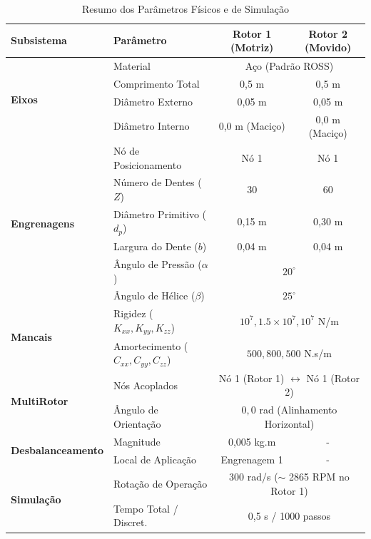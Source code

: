 \documentclass[10pt,fleqn,a4paper,twoside]{article}
\begin{document}
	\begin{table}[H] %
		\centering
		\caption{Resumo dos Parâmetros Físicos e de Simulação}
		\label{tab:parametros_multirotor}
		\renewcommand{\arraystretch}{1.2} 
		\begin{tabular}{@{}llcc@{}}
			\toprule
			\textbf{Subsistema} & \textbf{Parâmetro} & \textbf{Rotor 1 (Motriz)} & \textbf{Rotor 2 (Movido)} \\ \midrule
			
			\multirow{4}{*}{\textbf{Eixos}} 
			& Material & \multicolumn{2}{c}{Aço (Padrão ROSS)} \\
			& Comprimento Total & 0,5 m & 0,5 m \\
			& Diâmetro Externo & 0,05 m & 0,05 m \\
			& Diâmetro Interno & 0,0 m (Maciço) & 0,0 m (Maciço) \\ \midrule
			
			\multirow{6}{*}{\textbf{Engrenagens}} 
			& Nó de Posicionamento & Nó 1 & Nó 1 \\
			& Número de Dentes ($Z$) & 30 & 60 \\
			& Diâmetro Primitivo ($d_p$) & 0,15 m & 0,30 m \\
			& Largura do Dente ($b$) & 0,04 m & 0,04 m \\
			& Ângulo de Pressão ($\alpha$) & \multicolumn{2}{c}{$20^\circ$} \\
			& Ângulo de Hélice ($\beta$) & \multicolumn{2}{c}{$25^\circ$} \\ \midrule
			
			\multirow{2}{*}{\textbf{Mancais}} 
			& Rigidez ($K_{xx}, K_{yy}, K_{zz}$) & \multicolumn{2}{c}{$10^7, 1.5 \times 10^7, 10^7$ N/m} \\
			& Amortecimento ($C_{xx}, C_{yy}, C_{zz}$) & \multicolumn{2}{c}{$500, 800, 500$ N.s/m} \\ \midrule
			
			\multirow{2}{*}{\textbf{MultiRotor}} 
			& Nós Acoplados & \multicolumn{2}{c}{Nó 1 (Rotor 1) $\leftrightarrow$ Nó 1 (Rotor 2)} \\
			& Ângulo de Orientação & \multicolumn{2}{c}{$0,0$ rad (Alinhamento Horizontal)} \\ \midrule
			
			\multirow{2}{*}{\textbf{Desbalanceamento}} 
			& Magnitude & 0,005 kg.m & - \\
			& Local de Aplicação & Engrenagem 1 & - \\ \midrule
			
			\multirow{3}{*}{\textbf{Simulação}} 
			& Rotação de Operação & \multicolumn{2}{c}{300 rad/s ($\sim$ 2865 RPM no Rotor 1)} \\
			& Tempo Total / Discret. & \multicolumn{2}{c}{0,5 s / 1000 passos} \\ 
			\bottomrule
		\end{tabular}
	\end{table}
	
\end{document}
